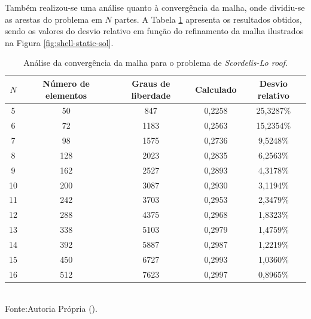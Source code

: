 Também realizou-se uma análise quanto à convergência da malha, onde dividiu-se as arestas do problema em $N$ partes. A Tabela \ref{tab:scordelis-sol} apresenta os resultados obtidos, sendo os valores do desvio relativo em função do refinamento da malha ilustrados na Figura \ref{fig:shell-static-sol}.

\begin{table}[h!]
    \centering
    \caption{Análise da convergência da malha para o problema de \textit{Scordelis-Lo roof}.}
    \begin{tabular}{ccccc}
        \hline
        $N$ & Número de elementos & Graus de liberdade & Calculado & Desvio relativo \\\hline
        5   & 50                  & 847                & 0,2258    & 25,3287\%       \\
        6   & 72                  & 1183               & 0,2563    & 15,2354\%       \\
        7   & 98                  & 1575               & 0,2736    & 9,5248\%        \\
        8   & 128                 & 2023               & 0,2835    & 6,2563\%        \\
        9   & 162                 & 2527               & 0,2893    & 4,3178\%        \\
        10  & 200                 & 3087               & 0,2930    & 3,1194\%        \\
        11  & 242                 & 3703               & 0,2953    & 2,3479\%        \\
        12  & 288                 & 4375               & 0,2968    & 1,8323\%        \\
        13  & 338                 & 5103               & 0,2979    & 1,4759\%        \\
        14  & 392                 & 5887               & 0,2987    & 1,2219\%        \\
        15  & 450                 & 6727               & 0,2993    & 1,0360\%        \\
        16  & 512                 & 7623               & 0,2997    & 0,8965\%        \\\hline
    \end{tabular}
    \\Fonte:Autoria Própria (\the\year).
    \label{tab:scordelis-sol}
\end{table}

